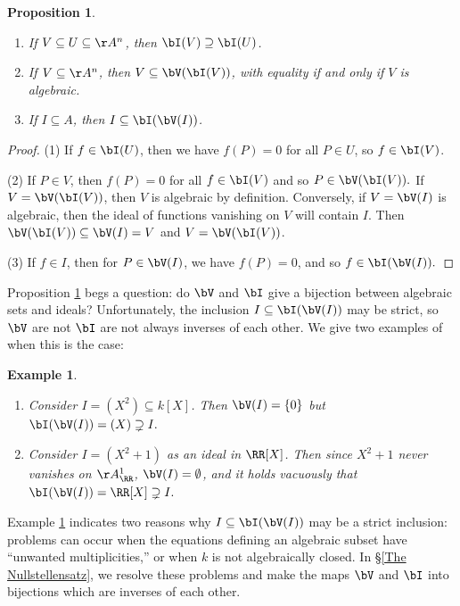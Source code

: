 \documentclass[12pt]{amsart}
\theoremstyle{plain}
\newtheorem{proposition}[theorem]{Proposition}
\newtheorem{example}[theorem]{Example}
\begin{document}
\begin{proposition}\label{iproperties}
\begin{enumerate}
\item If $V \subseteq U \subseteq \AA^n$, then $\bI(V) \supseteq \bI(U)$.
\item If $V \subseteq \AA^n$, then $V \subseteq \bV(\bI(V))$, with equality if and only if $V$ is algebraic.
\item If $I \subseteq A$, then $I \subseteq \bI(\bV(I))$.
\end{enumerate}
\end{proposition}
\begin{proof}
(1) If $f \in \bI(U)$, then we have $f(P) = 0$ for all $P \in U$, so $f \in \bI(V)$.

(2) If $P \in V$, then $f(P) = 0$ for all $f \in \bI(V)$ and so $P \in \bV(\bI(V)).$
If $V = \bV(\bI(V))$, then $V$ is algebraic by definition.
Conversely, if $V = \bV(I)$ is algebraic, then the ideal of functions vanishing on $V$ will contain $I$.
Then $\bV(\bI(V)) \subseteq \bV(I) = V$ and $V = \bV(\bI(V))$.

(3) If $f \in I$, then for $P \in \bV(I)$, we have $f(P) = 0$, and so $f \in \bI(\bV(I)).$
\end{proof}

Proposition \ref{iproperties} begs a question: do $\bV$ and $\bI$ give a bijection between algebraic sets and ideals?
Unfortunately, the inclusion $I \subseteq \bI(\bV(I))$ may be strict, so $\bV$ are not $\bI$ are not always inverses of each other.
We give two examples of when this is the case:

\begin{example}\label{inclfails}
\begin{enumerate}
\item
Consider $I = (X^2) \subseteq k[X]$.
Then $\bV(I) = \{0\}$ but $\bI(\bV(I)) = (X) \supsetneq I.$

\item
Consider $I = (X^2+1)$ as an ideal in $\RR[X]$.
Then since $X^2+1$ never vanishes on $\AA^1_\RR$, $\bV(I) = \emptyset$, and it holds vacuously that $\bI(\bV(I)) = \RR[X] \supsetneq I.$
\end{enumerate}
\end{example}

Example \ref{inclfails} indicates two reasons why $I \subseteq \bI(\bV(I))$ may be a strict inclusion:
problems can occur when the equations defining an algebraic subset have ``unwanted multiplicities,'' or when $k$ is not algebraically closed.
In \S \ref{The Nullstellensatz}, we resolve these problems and make the maps $\bV$ and $\bI$ into bijections which are inverses of each other.
\end{document}
